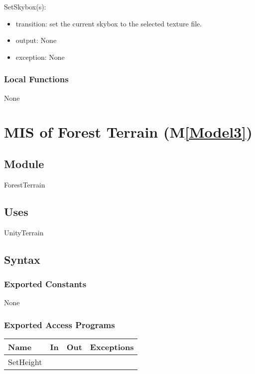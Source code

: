 \documentclass[12pt, titlepage]{article}
\newcommand{\mref}[1]{M\ref{#1}}
\begin{document}
\noindent SetSkybox(s):
\begin{itemize}
\item transition: set the current skybox to the selected texture file.
\item output: None
\item exception: None
\end{itemize}

\subsubsection{Local Functions}
None

\newpage

\section{MIS of Forest Terrain (\mref{Model3})} 
\subsection{Module}

ForestTerrain

\subsection{Uses}

UnityTerrain

\subsection{Syntax}

\subsubsection{Exported Constants}
None
\subsubsection{Exported Access Programs}

\begin{center}
\begin{tabular}{|l| l | l | p{5cm}|}
\hline
\textbf{Name} & \textbf{In} & \textbf{Out} & \textbf{Exceptions} \\
\hline
SetHeight &  &  &  \\
\hline
\end{tabular}
\end{center}
\end{document}
